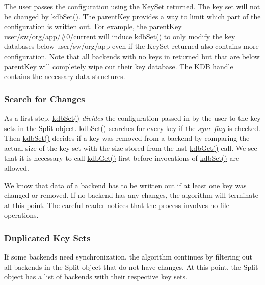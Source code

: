 The user passes the configuration using the {\ttfamily Key\+Set} {\ttfamily returned}. The key set will not be changed by {\ttfamily \hyperlink{group__kdb_ga11436b058408f83d303ca5e996832bcf}{kdb\+Set()}}. The {\ttfamily parent\+Key} provides a way to limit which part of the configuration is written out. For example, the {\ttfamily parent\+Key} {\ttfamily user/sw/org/app/\#0/current} will induce {\ttfamily \hyperlink{group__kdb_ga11436b058408f83d303ca5e996832bcf}{kdb\+Set()}} to only modify the key databases below {\ttfamily user/sw/org/app} even if the {\ttfamily Key\+Set} {\ttfamily returned} also contains more configuration. Note that all backends with no keys in {\ttfamily returned} but that are below {\ttfamily parent\+Key} will completely wipe out their key database. The {\ttfamily K\+DB} handle contains the necessary data structures.

\subsubsection*{Search for Changes}

As a first step, {\ttfamily \hyperlink{group__kdb_ga11436b058408f83d303ca5e996832bcf}{kdb\+Set()}} {\itshape divides} the configuration passed in by the user to the key sets in the {\ttfamily Split} object. {\ttfamily \hyperlink{group__kdb_ga11436b058408f83d303ca5e996832bcf}{kdb\+Set()}} searches for every key if the {\itshape sync flag} is checked. Then {\ttfamily \hyperlink{group__kdb_ga11436b058408f83d303ca5e996832bcf}{kdb\+Set()}} decides if a key was removed from a backend by comparing the actual size of the key set with the size stored from the last {\ttfamily \hyperlink{group__kdb_ga28e385fd9cb7ccfe0b2f1ed2f62453a1}{kdb\+Get()}} call. We see that it is necessary to call {\ttfamily \hyperlink{group__kdb_ga28e385fd9cb7ccfe0b2f1ed2f62453a1}{kdb\+Get()}} first before invocations of {\ttfamily \hyperlink{group__kdb_ga11436b058408f83d303ca5e996832bcf}{kdb\+Set()}} are allowed.

We know that data of a backend has to be written out if at least one key was changed or removed. If no backend has any changes, the algorithm will terminate at this point. The careful reader notices that the process involves no file operations.

\subsubsection*{Duplicated Key Sets}

If some backends need synchronization, the algorithm continues by filtering out all backends in the {\ttfamily Split} object that do not have changes. At this point, the {\ttfamily Split} object has a list of backends with their respective key sets.

